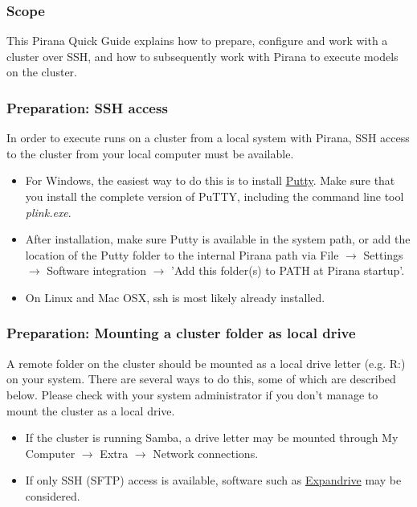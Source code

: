 \begin{center}
   {\colorbox{grey2}{
         \begin{minipage}[t]{0.9\textwidth}
         \subsubsection*{Scope}
     This Pirana Quick Guide explains how to prepare,  configure and work with a cluster over SSH, 
and how to subsequently work with Pirana to execute models on the cluster. 
         \end{minipage}
      }
   }
\end{center}

\subsubsection*{Preparation: SSH access}
In order to execute runs on a cluster from a local system with Pirana, SSH access
to the cluster from your local computer must be available. 
\begin{itemize}
\item For Windows, the easiest way to do this is to install
  \href{'http://www.chiark.greenend.org.uk/~sgtatham/putty/''}{Putty}. Make
  sure that you install the complete version of PuTTY, including the
  command line tool \emph{plink.exe}.
\item After installation, make sure Putty is available in the system
  path, or add the location of the Putty folder to the internal Pirana
  path via File $\rightarrow$ Settings $\rightarrow$ Software
  integration $\rightarrow$ 'Add this folder(s) to PATH at Pirana
  startup'.
\item On Linux and Mac OSX, ssh is most likely already installed.
\end{itemize}

\subsubsection*{Preparation: Mounting a cluster folder as local drive}
A remote folder on the cluster should be mounted as a local drive
letter (e.g. R:) on your system. There are several ways to do this,
some of which are described below. Please check with your system
administrator if you don't manage to mount the cluster as a local drive.
\begin{itemize}
\item If the cluster is running Samba, a drive letter may be mounted
  through My Computer $\rightarrow$ Extra $\rightarrow$ Network
  connections.
\item If only SSH (SFTP) access is available, software such as
  \href{'http://www.expandrive.com/''}{Expandrive} may be considered.
\end{itemize}



